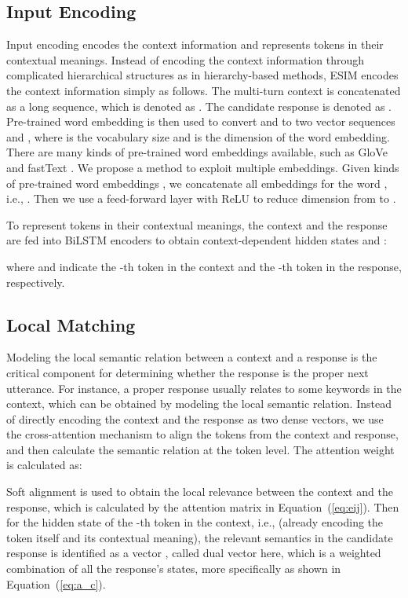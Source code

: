 \documentclass[letterpaper]{article} \usepackage{aaai19}  \usepackage{times}  \usepackage{helvet}  \usepackage{courier}  \usepackage{url}  \usepackage{graphicx}
\begin{document}
\subsection{Input Encoding}
\label{sec:input}
Input encoding encodes the context information and represents tokens in their contextual meanings. Instead of encoding the context information through complicated hierarchical structures as in hierarchy-based methods, ESIM encodes the context information simply as follows. The multi-turn context is concatenated as a long sequence, which is denoted as . The candidate response is denoted as . Pre-trained word embedding  is then used to convert  and  to two vector sequences  and , where  is the vocabulary size and  is the dimension of the word embedding. There are many kinds of pre-trained word embeddings available, such as GloVe \cite{DBLP:conf/emnlp/PenningtonSM14} and fastText \cite{DBLP:conf/lrec/MikolovGBPJ18}. We propose a method to exploit multiple embeddings. Given  kinds of pre-trained word embeddings , we concatenate all embeddings for the word , i.e., . Then we use a feed-forward layer with ReLU to reduce dimension from  to .

To represent tokens in their contextual meanings, the context and the response are fed into BiLSTM encoders to obtain context-dependent hidden states  and :

\noindent where  and  indicate the -th token in the context and the -th token in the response, respectively.

\subsection{Local Matching}
Modeling the local semantic relation between a context and a response is the critical component for determining whether the response is the proper next utterance. For instance, a proper response usually relates to some keywords in the context, which can be obtained by modeling the local semantic relation. 
Instead of directly encoding the context and the response as two dense vectors, we use the cross-attention mechanism to align the tokens from the context and response, and then calculate the semantic relation at the token level. The attention weight is calculated as:


Soft alignment is used to obtain the local relevance between the context and the response, which is calculated by the attention matrix   in Equation~(\ref{eq:eij}). Then for the hidden state of the -th token in the context, i.e.,  (already encoding the token itself and its contextual meaning), the relevant semantics in the candidate response is 
identified as a vector , called dual vector here, which is a weighted combination of all the response's states, more specifically as shown in Equation~(\ref{eq:a_c}).
\end{document}
